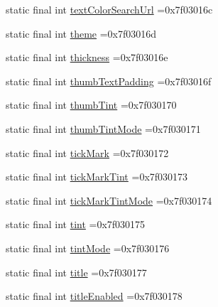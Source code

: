\begin{DoxyCompactItemize}
\item 
static final int \mbox{\hyperlink{classbr_1_1unb_1_1cic_1_1mp_1_1marketmaster_1_1R_1_1attr_a343d2d2ea1b604f6fc9688ec41fa79bc}{text\+Color\+Search\+Url}} =0x7f03016c
\item 
static final int \mbox{\hyperlink{classbr_1_1unb_1_1cic_1_1mp_1_1marketmaster_1_1R_1_1attr_ae1fc06a93145662b5748205584a1fc2e}{theme}} =0x7f03016d
\item 
static final int \mbox{\hyperlink{classbr_1_1unb_1_1cic_1_1mp_1_1marketmaster_1_1R_1_1attr_ae8f804fa4efec8a67e55a3683deeadac}{thickness}} =0x7f03016e
\item 
static final int \mbox{\hyperlink{classbr_1_1unb_1_1cic_1_1mp_1_1marketmaster_1_1R_1_1attr_a7a423c5b02f08b0fb08738dc9c9e5cdd}{thumb\+Text\+Padding}} =0x7f03016f
\item 
static final int \mbox{\hyperlink{classbr_1_1unb_1_1cic_1_1mp_1_1marketmaster_1_1R_1_1attr_a879d72958471514da0c442b4e224949f}{thumb\+Tint}} =0x7f030170
\item 
static final int \mbox{\hyperlink{classbr_1_1unb_1_1cic_1_1mp_1_1marketmaster_1_1R_1_1attr_af234d27a153c7fa14c9974797aa4987b}{thumb\+Tint\+Mode}} =0x7f030171
\item 
static final int \mbox{\hyperlink{classbr_1_1unb_1_1cic_1_1mp_1_1marketmaster_1_1R_1_1attr_a086d8aeb8332e1a96376312eae4a5d27}{tick\+Mark}} =0x7f030172
\item 
static final int \mbox{\hyperlink{classbr_1_1unb_1_1cic_1_1mp_1_1marketmaster_1_1R_1_1attr_a8a21d954a191ec396e6d18baccf4c56a}{tick\+Mark\+Tint}} =0x7f030173
\item 
static final int \mbox{\hyperlink{classbr_1_1unb_1_1cic_1_1mp_1_1marketmaster_1_1R_1_1attr_a909fd338c738f6f270128b1e0590a466}{tick\+Mark\+Tint\+Mode}} =0x7f030174
\item 
static final int \mbox{\hyperlink{classbr_1_1unb_1_1cic_1_1mp_1_1marketmaster_1_1R_1_1attr_a93e8fc7838236b3ef902c9e1671369d6}{tint}} =0x7f030175
\item 
static final int \mbox{\hyperlink{classbr_1_1unb_1_1cic_1_1mp_1_1marketmaster_1_1R_1_1attr_abd58445a2d73fa01031eb0aeed58bb0b}{tint\+Mode}} =0x7f030176
\item 
static final int \mbox{\hyperlink{classbr_1_1unb_1_1cic_1_1mp_1_1marketmaster_1_1R_1_1attr_ae9af1f3d5182cf675e078ad21a7f0903}{title}} =0x7f030177
\item 
static final int \mbox{\hyperlink{classbr_1_1unb_1_1cic_1_1mp_1_1marketmaster_1_1R_1_1attr_a2c0eadd71201b9dc67e8f6fb24b40915}{title\+Enabled}} =0x7f030178

\end{DoxyCompactItemize}
